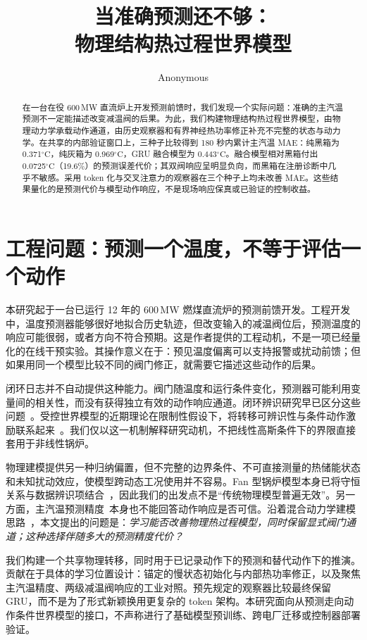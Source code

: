 \documentclass{article}
\title{当准确预测还不够：\\物理结构热过程世界模型}
\author{Anonymous}
\newcommand{\degc}{\ensuremath{^{\circ}\mathrm{C}}}
\begin{document}
\maketitle

\begin{abstract}
在一台在役 600\,MW 直流炉上开发预测前馈时，我们发现一个实际问题：准确的主汽温预测不一定能描述改变减温阀的后果。为此，我们构建物理结构热过程世界模型，由物理动力学承载动作通道，由历史观察器和有界神经热功率修正补充不完整的状态与动力学。在共享的内部验证窗口上，三种子比较得到 180 秒内累计主汽温 MAE：纯黑箱为 0.371\degc{}，纯灰箱为 0.969\degc{}，GRU 融合模型为 0.443\degc{}。融合模型相对黑箱付出 0.0725\degc{}（19.6\%）的预测误差代价；其双阀响应呈明显负向，而黑箱在注册诊断中几乎不敏感。采用 token 化与交叉注意力的观察器在三个种子上均未改善 MAE。这些结果量化的是预测代价与模型动作响应，不是现场响应保真或已验证的控制收益。
\end{abstract}

\section{工程问题：预测一个温度，不等于评估一个动作}

本研究起于一台已运行 12 年的 600\,MW 燃煤直流炉的预测前馈开发。工程开发中，温度预测器能够很好地拟合历史轨迹，但改变输入的减温阀位后，预测温度的响应可能很弱，或者方向不符合预期。这是作者提供的工程动机，不是一项已经量化的在线干预实验。其操作意义在于：预见温度偏离可以支持报警或扰动前馈；但如果用同一个模型比较不同的阀门修正，就需要它描述这些动作的后果。

闭环日志并不自动提供这种能力。阀门随温度和运行条件变化，预测器可能利用变量间的相关性，而没有获得独立有效的动作响应通道。闭环辨识研究早已区分这些问题~\cite{forssell1999closedloop}。受控世界模型的近期理论在限制性假设下，将转移可辨识性与条件动作激励联系起来~\cite{zhang2026identifiability}。我们仅以这一机制解释研究动机，不把线性高斯条件下的界限直接套用于非线性锅炉。

物理建模提供另一种归纳偏置，但不完整的边界条件、不可直接测量的热储能状态和未知扰动效应，使模型跨动态工况使用并不容易。Fan 型锅炉模型本身已将守恒关系与数据辨识项结合~\cite{fan2020thermal}，因此我们的出发点不是“传统物理模型普遍无效”。另一方面，主汽温预测精度~\cite{zhang2026sst}本身也不能回答动作响应是否可信。沿着混合动力学建模思路~\cite{rackauckas2020ude,yin2021aphynity}，本文提出的问题是：\emph{学习能否改善物理热过程模型，同时保留显式阀门通道；这种选择伴随多大的预测精度代价？}

我们构建一个共享物理转移，同时用于已记录动作下的预测和替代动作下的推演。贡献在于具体的学习位置设计：锚定的慢状态初始化与内部热功率修正，以及聚焦主汽温精度、两级减温阀响应的工业对照。预先规定的观察器比较最终保留 GRU，而不是为了形式新颖换用更复杂的 token 架构。本研究面向从预测走向动作条件世界模型的接口，不声称进行了基础模型预训练、跨电厂迁移或控制器部署验证。
\end{document}
